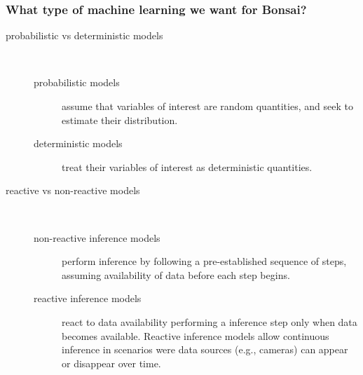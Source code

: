 \begin{frame}
    \frametitle{What type of machine learning we want for Bonsai?}

    \begin{description}

        \item[probabilistic vs deterministic models]\mbox{}\\

            \begin{description}

                \item[probabilistic models] assume that variables of interest are random
      quantities, and seek to estimate their distribution.

                \item[deterministic models]treat their variables of interest as deterministic
      quantities.

            \end{description}

  \item[reactive vs non-reactive models]\mbox{}\\

            \begin{description}

            \item[non-reactive inference models] perform inference by following a pre-established sequence of steps, assuming availability of data before each step begins.

            \item[reactive inference models] react to data availability performing a inference step only when data becomes available. Reactive inference models allow continuous inference in scenarios were data sources (e.g., cameras) can appear or disappear over time.

            \end{description}

    \end{description}

\end{frame}

